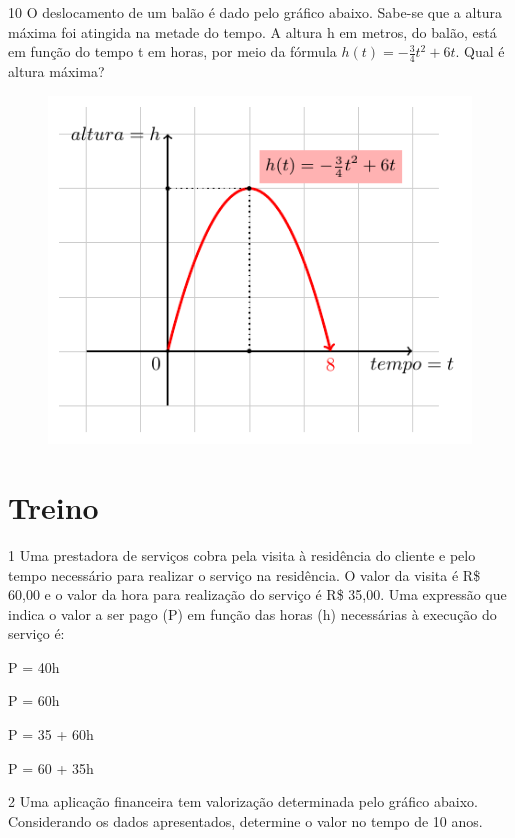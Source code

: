 \pagebreak
\num{10} O deslocamento de um balão é dado pelo gráfico abaixo. Sabe-se que a
altura máxima foi atingida na metade do tempo. A altura h em metros, do
balão, está em função do tempo t em horas, por meio da fórmula 
$h(t) = - \frac{3}{4} t^2 + 6t$. Qual é altura máxima?

\begin{figure}[htpb!]
\centering
\includegraphics[width=.5\textwidth]{./tikz/010.pdf}
\end{figure}

\begin{emptybox}
\end{emptybox}

\section*{Treino}

\num{1} Uma prestadora de serviços cobra pela visita à residência do
cliente e pelo tempo necessário para realizar o serviço na residência. O
valor da visita é R\$ 60,00 e o valor da hora para realização do serviço é
R\$ 35,00. Uma expressão que indica o valor a ser pago (P) em função das
horas (h) necessárias à execução do serviço é:

\begin{escolha}
  \item P = 40h

  \item P = 60h

  \item P = 35 + 60h

  \item P = 60 + 35h
\end{escolha}

\pagebreak
\num{2} Uma aplicação financeira tem valorização determinada pelo gráfico abaixo.
Considerando os dados apresentados, determine o valor no tempo de 10 anos.


